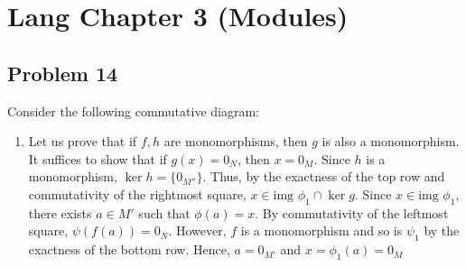 \documentclass[Lang.tex]{subfiles}
\begin{document}
\section*{Lang Chapter 3 (Modules)}

\subsection{Problem 14}

Consider the following commutative diagram:


	\begin{enumerate}
		\item Let us prove that if $f,h$ are monomorphisms, then $g$ is also a monomorphism. It suffices to show that if $g(x) = 0_N$, then $x = 0_M$. Since $h$ is a monomorphism, $\ker h = \{0_{M''}\}$. Thus, by the exactness of the top row and commutativity of the rightmost square, $x \in \text{img }\phi_1 \cap \ker{g}$. Since $x \in \text{img }\phi_1$, there exists $a \in M'$ such that $\phi(a) = x$. By commutativity of the leftmost square, $\psi(f(a)) = 0_N$. However, $f$ is a monomorphism and so is $\psi_1$ by the exactness of the bottom row. Hence, $a = 0_{M'}$ and $x = \phi_1(a) = 0_M$
	\end{enumerate}
\end{document}
